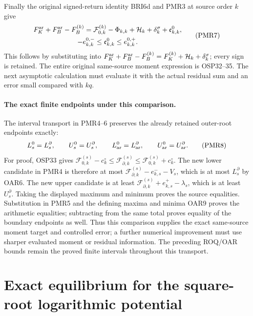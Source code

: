 \documentclass[11pt,a4paper]{article}
\begin{document}
Finally the original signed-return identity BRI6d and PMR3 at
source order $k$ give
\[
 \begin{gathered}
 F_K^{\rm ar}+F_B^{\rm ar}-F_B^{(k)}
   =\mathcal F_{0,k}^{(k)}-\Phi_{k,k}
      +\mathcal H_k+\delta_k^\sigma+\mathfrak e^0_{k,k},\\
 -e_{k,k}^{0,-}\le\mathfrak e^0_{k,k}\le e_{k,k}^{0,+}.
 \end{gathered}\tag{PMR7}
\]
This follows by substituting into
$F_K^{\rm ar}+F_B^{\rm ar}-F_B^{(k)}=F_K^{(k)}+
\mathcal H_k+\delta_k^\sigma$; every sign is retained.
The entire original same-source moment expression is OSP32--35.
The next asymptotic calculation must evaluate it with the actual
residual sum and an error small compared with $kq$.

\paragraph{The exact finite endpoints under this comparison.}
The interval transport in PMR4--6 preserves the already retained
outer-root endpoints exactly:
\[
 L_s^0=L_s^\partial,\qquad U_s^0=U_s^\partial,\qquad
 L_{\rm ar}^0=L_{\rm ar}^\partial,\qquad
 U_{\rm ar}^0=U_{\rm ar}^\partial.
 \tag{PMR8}
\]
For proof, OSP33 gives
$\mathcal F_{0,k}^{(s)}-c_k^\circ\le\mathcal F_{\partial,k}^{(s)}
\le\mathcal F_{0,k}^{(s)}+c_k^\circ$.
The new lower candidate in PMR4 is therefore at most
$\mathcal F_{\partial,k}^{(s)}-e_{k,s}^--V_s$, which is at
most $L_s^\partial$ by OAR6. The new upper candidate is at
least $\mathcal F_{\partial,k}^{(s)}+e_{k,s}^+-\lambda_s$,
which is at least $U_s^\partial$. Taking the displayed maximum
and minimum proves the source equalities. Substitution in PMR5
and the defining maxima and minima OAR9 proves the arithmetic
equalities; subtracting from the same total proves equality of
the boundary endpoints as well. Thus this comparison supplies
the exact same-source moment target and controlled error; a
further numerical improvement must use sharper evaluated moment
or residual information. The preceding ROQ/OAR bounds remain
the proved finite intervals throughout this transport.



\clearpage
\section{Exact equilibrium for the square-root logarithmic potential}
\label{sec:independent-sqrt-log-equilibrium}
\end{document}
